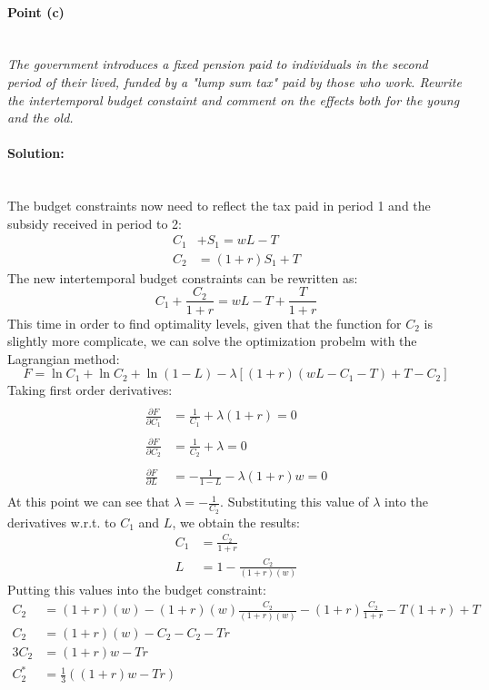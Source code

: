 \documentclass[12pt]{article}
\newcommand{\myparagraph}[1]{\paragraph{#1}\mbox{}\\}
\begin{document}
\myparagraph{Point (c)}
\textit{The government introduces a fixed pension paid to individuals in the second period of their lived, funded by a "lump sum tax" paid by those who work. Rewrite the intertemporal budget constaint and comment on the effects both for the young and the old.}
\myparagraph{Solution:}
The budget constraints now need to reflect the tax paid in period 1 and the subsidy received in period to 2: 
\begin{align*}
C_1 &+ S_1 = wL - T \\
C_2 &= (1 + r)S_1 + T
\end{align*}
The new intertemporal budget constraints can be rewritten as: 
\begin{equation}
C_1 + \frac{C_2}{1 + r} = wL - T + \frac{T}{1+r}
\end{equation}
This time in order to find optimality levels, given that the function for $C_2$ is slightly more complicate, we can solve the optimization probelm with the Lagrangian method:
\begin{equation}
F = \ln C_1 + \ln C_2 + \ln(1 - L) - \lambda[(1 + r)(wL - C_1 - T) + T - C_2]
\end{equation}
Taking first order derivatives: 
\begin{align*}
\\
\frac{\partial F}{\partial C_1} &= \frac{1}{C_1} + \lambda(1+r) = 0 \\\\
\frac{\partial F}{\partial C_2} &= \frac{1}{C_2} + \lambda = 0\\\\
\frac{\partial F}{\partial L}  &= - \frac{1}{1 - L} - \lambda(1 + r)w = 0
\\
\end{align*}
At this point we can see that $\lambda = -\frac{1}{C_2}$. Substituting this value of $\lambda$ into the derivatives w.r.t. to $C_1$ and $L$, we obtain the results: 
\begin{align}
C_1 &= \frac{C_2}{1 + r}\\
L &= 1 - \frac{C_2}{(1+r)(w)}
\end{align}
Putting this values into the budget constraint: 
\begin{align*}
C_2 &= (1 + r)(w) - (1 + r)(w)\frac{C_2}{(1 + r)(w)} - (1 + r)\frac{C_2}{1 + r} - T(1 + r) + T\\
C_2 &= (1 + r)(w) - C_2 - C_2 - Tr \\
3C_2 &= (1 + r)w - Tr \\
C_2^{*} &= \frac{1}{3}((1 + r)w - Tr)
\end{align*}
\end{document}
